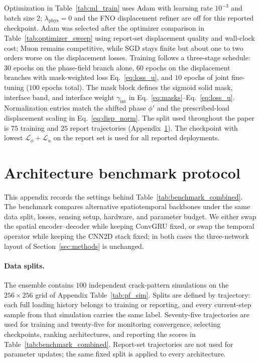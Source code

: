 \documentclass[10pt]{article}
\theoremstyle{definition}
\begin{document}
Optimization in Table~\ref{tab:ml_train} uses Adam with learning rate $10^{-3}$ and batch size $2$; $\lambda_{\mathrm{phys}}=0$ and the FNO displacement refiner are off for this reported checkpoint.
%
Adam was selected after the optimizer comparison in Table~\ref{tab:optimizer_sweep} using report-set displacement quality and wall-clock cost; Muon remains competitive, while SGD stays finite but about one to two orders worse on the displacement losses.
%
Training follows a three-stage schedule: $30$ epochs on the phase-field branch alone, $60$ epochs on the displacement branches with mask-weighted loss Eq.~\eqref{eq:loss_u}, and $10$ epochs of joint fine-tuning ($100$ epochs total).
%
The mask block defines the sigmoid solid mask, interface band, and interface weight $\gamma_{\mathrm{int}}$ in Eq.~\eqref{eq:masks}--Eq.~\eqref{eq:loss_u}.
%
Normalization entries match the shifted phase $\phi'$ and the prescribed-load displacement scaling in Eq.~\eqref{eq:disp_norm}.
%
The split used throughout the paper is $75$ training and $25$ report trajectories (Appendix~\ref{sec:app_benchmark}).
%
The checkpoint with lowest $\mathcal{L}_\phi+\mathcal{L}_u$ on the report set is used for all reported deployments.

\section{Architecture benchmark protocol}\label{sec:app_benchmark}

This appendix records the settings behind Table~\ref{tab:benchmark_combined}.
%
The benchmark compares alternative spatiotemporal backbones under the same data split, losses, sensing setup, hardware, and parameter budget.
%
We either swap the spatial encoder--decoder while keeping ConvGRU fixed, or swap the temporal operator while keeping the CNN2D stack fixed; in both cases the three-network layout of Section~\ref{sec:methods} is unchanged.

\paragraph{Data splits.}
The ensemble contains $100$ independent crack-pattern simulations on the $256\times256$ grid of Appendix Table~\ref{tab:pf_sim}.
%
Splits are defined by trajectory: each full loading history belongs to training or reporting, and every current-step sample from that simulation carries the same label.
%
Seventy-five trajectories are used for training and twenty-five for monitoring convergence, selecting checkpoints, ranking architectures, and reporting the scores in Table~\ref{tab:benchmark_combined}.
%
Report-set trajectories are not used for parameter updates; the same fixed split is applied to every architecture.
\end{document}
